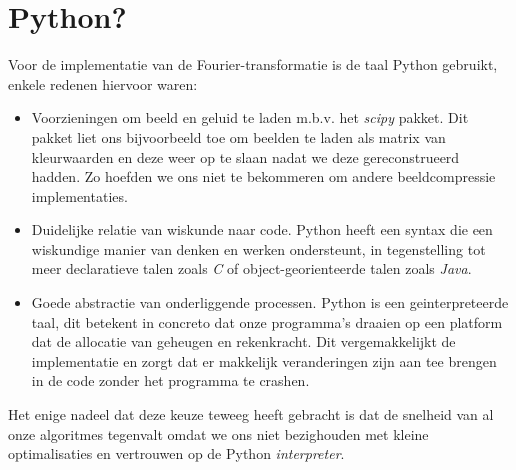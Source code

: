 \section{Python?}
Voor de implementatie van de Fourier-transformatie is de taal Python gebruikt,
enkele redenen hiervoor waren:
\begin{itemize}
\item Voorzieningen om beeld en geluid te laden m.b.v. het \emph{scipy} pakket.
  Dit pakket liet ons bijvoorbeeld toe om beelden te laden als matrix van kleurwaarden en deze weer op te slaan
  nadat we deze gereconstrueerd hadden. Zo hoefden we ons niet te bekommeren om andere beeldcompressie implementaties.
\item Duidelijke relatie van wiskunde naar code. Python heeft een syntax die een wiskundige manier van denken en werken
  ondersteunt, in tegenstelling tot meer declaratieve talen zoals \emph{C} of object-georienteerde talen zoals \emph{Java}.
\item Goede abstractie van onderliggende processen. Python is een geinterpreteerde taal, dit betekent in concreto
  dat onze programma's draaien op een platform dat de allocatie van geheugen en rekenkracht. Dit vergemakkelijkt
  de implementatie en zorgt dat er makkelijk veranderingen zijn aan tee brengen in de code zonder het programma te crashen.
\end{itemize}
Het enige nadeel dat deze keuze teweeg heeft gebracht is dat de snelheid van al onze algoritmes tegenvalt
omdat we ons niet bezighouden met kleine optimalisaties en vertrouwen op de Python \emph{interpreter}.
